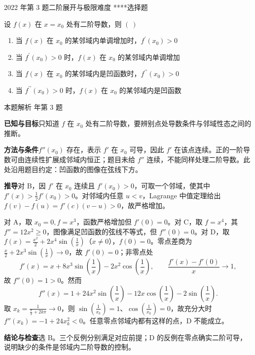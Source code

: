 \documentclass[UTF8,zihao=-4,fontset=fandol]{ctexart}
\newenvironment{abcd}{\begin{enumerate}[label=\textup{(\Alph*)},leftmargin=2.3em,itemsep=1pt,topsep=4pt,parsep=1pt]}{\end{enumerate}}
\newcommand{\choices}[4]{%
  \begin{abcd}
    \item #1
    \item #2
    \item #3
    \item #4
  \end{abcd}}
\newcounter{BankQuestion}
\newcommand{\QuestionPage}[7]{%
  \stepcounter{BankQuestion}%
  \par\noindent\begin{minipage}{\linewidth}
  \raggedright
  {\small\textcolor{black!60}{#3\quad #5\quad 难度 #7}\hfill\textcolor{accent}{#2}}\par\smallskip}
\newcommand{\QuestionEnd}{\end{minipage}\par\medskip}
\newcommand{\QuestionPage}[7]{%
  \clearpage
  \stepcounter{BankQuestion}%
  {\small\textcolor{accent}{#1\hfill #2}}\par\medskip
  {\small\textcolor{black!60}{#3\quad #5\quad 难度 #7\hfill \arabic{BankQuestion} / 234}}\par\vspace{9bp}}
\newcommand{\QuestionEnd}{}
\newenvironment{QuestionSolution}[1]{%
  \clearpage
  {\small\textcolor{black!60}{本题解析\quad #1}}\par\medskip
}{\par\clearpage}
\begin{document}
\QuestionPage{2.5 Taylor定理及其应用}{选择题}{2022 年第 3 题}{1}{二阶展开与极限}{099 / 234}{****}
设 \(f\left( x \right)\) 在 \(x = x_{0}\) 处有二阶导数，则 \(\left( \ \right)\)
\choices{当 \(f\left( x \right)\) 在 \(x_{0}\) 的某邻域内单调增加时，\(f^{\prime}\left( x_{0} \right) > 0\)}{当 \(f^{\prime}\left( x_{0} \right) > 0\) 时，\(f\left( x \right)\) 在 \(x_{0}\) 的某邻域内单调增加}{当 \(f\left( x \right)\) 在 \(x_{0}\) 的某邻域内是凹函数时，\(f^{\prime\prime}\left( x_{0} \right) > 0\)}{当 \(f^{\prime\prime}\left( x_{0} \right) > 0\) 时，\(f\left( x \right)\) 在 \(x_{0}\) 的某邻域内是凹函数}
\QuestionEnd

\begin{QuestionSolution}{2022 年第 3 题}
\textbf{已知与目标}\quad 只知道 \(f\) 在 \(x_0\) 处有二阶导数，要辨别点处导数条件与邻域性态之间的推断。

\textbf{方法与条件}\quad \(f''(x_0)\) 存在，表示 \(f'\) 在 \(x_0\) 可导，因此 \(f'\) 在该点连续。正的一阶导数可由连续性扩展成邻域内恒正；题目未给 \(f''\) 连续，不能同样处理二阶导数。此处沿用题目约定：凹函数的图像在弦线下方。

\textbf{推导}\quad 对 B，因 \(f'\) 在 \(x_0\) 连续且 \(f'(x_0)>0\)，可取一个邻域，使其中 \(f'(x)>\frac12f'(x_0)>0\)。对邻域内任意 \(u<v\)，Lagrange 中值定理给出 \(f(v)-f(u)=f'(c)(v-u)>0\)，故严格增加。

对 A，取 \(x_0=0,f=x^3\)，函数严格增加但 \(f'(0)=0\)。对 C，取 \(f=x^4\)，其 \(f''=12x^2\ge0\)，图像满足凹函数的弦线不等式，但 \(f''(0)=0\)。对 D，取 \(f(x)=\frac{x^2}{2}+2x^4\sin(\frac1x)\)（\(x\ne0\)），\(f(0)=0\)。零点差商为 \(\frac x2+2x^3\sin(\frac1x)\to0\)，故 \(f'(0)=0\)；非零点处
\[f'(x)=x+8x^3\sin(\frac1x)-2x^2\cos(\frac1x),\qquad \frac{f'(x)-f'(0)}x\to1,\]
故 \(f''(0)=1>0\)。然而
\[
f''(x)=1+24x^2\sin(\frac{1}{x})-12x\cos(\frac{1}{x})-2\sin(\frac{1}{x}).
\]
取 \(x_k=\frac1{\frac\pi2+2k\pi}\to0\)，则 \(\sin(\frac1{x_k})=1\)、\(\cos(\frac1{x_k})=0\)，故充分大时 \(f''(x_k)=-1+24x_k^2<0\)。任意零点邻域内都有这样的点，D 不能成立。

\textbf{结论与检查}\quad 选 \(\boxed{\mathrm B}\)。三个反例分别满足对应前提；D 的反例在零点确实二阶可导，说明缺少的条件是邻域内二阶导数的控制。
\end{QuestionSolution}
\end{document}
